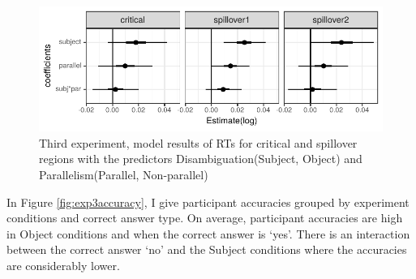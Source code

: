\begin{knitrout}
\color{fgcolor}\begin{figure}[hbt!]

{\centering \includegraphics[]{experiments/equivalance/report/figure/exp3critandsomodel-1.pdf} 

}

\caption[Third experiment, model results of RTs for critical and spillover regions with the predictors Disambiguation(Subject, Object) and Parallelism(Parallel, Non-parallel)]{Third experiment, model results of RTs for critical and spillover regions with the predictors Disambiguation(Subject, Object) and Parallelism(Parallel, Non-parallel)}\label{fig:exp3critandsomodel}
\end{figure}


\end{knitrout}

In Figure \ref{fig:exp3accuracy}, I give participant accuracies grouped by experiment conditions and correct answer type. On average, participant accuracies are high in Object conditions and when the correct answer is `yes'. There is an interaction between the correct answer `no' and the Subject conditions where the accuracies are considerably lower.

